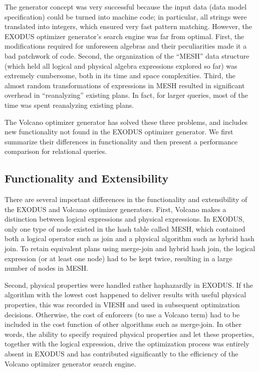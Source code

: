 \documentclass[a4paper,12pt,notitlepage,twoside,openright]{article}
\begin{document}
The generator concept was very successful because the input data (data
model specification) could be turned into machine code; in particular,
all strings were translated into integers, which ensured very fast
pattern matching. However, the EXODUS optimizer generator's search
engine was far from optimal. First, the modifications required for
unforeseen algebras and their peculiarities made it a bad patchwork of
code. Second, the organization of the ``MESH'' data structure (which
held all logical and physical algebra expressions explored so far) was
extremely cumbersome, both in its time and space complexities. Third,
the almost random transformations of expressions in MESH resulted in
significant overhead in ``reanalyzing'' existing plans. In fact, for
larger queries, most of the time was spent reanalyzing existing plans.

The Volcano optimizer generator has solved these three problems, and
includes new functionality not found in the EXODUS optimizer generator.
We first summarize their differences in functionality and then present a
performance comparison for relational queries.

\hypertarget{functionality-and-extensibility}{%
\subsection{Functionality and
Extensibility}\label{functionality-and-extensibility}}

There are several important differences in the functionality and
extensibility of the EXODUS and Volcano optimizer generators. First,
Volcano makes a distinction between logical expressions and physical
expressions. In EXODUS, only one type of node existed in the hash table
called MESH, which contained both a logical operator such as join and a
physical algorithm such as hybrid hash join. To retain equivalent plans
using merge-join and hybrid hash join, the logical expression (or at
least one node) had to be kept twice, resulting in a large number of
nodes in MESH.

Second, physical properties were handled rather haphazardly in EXODUS.
If the algorithm with the lowest cost happened to deliver results with
useful physical properties, this was recorded in VIESH and used in
subsequent optimization decisions. Otherwise, the cost of enforcers (to
use a Volcano term) had to be included in the cost function of other
algorithms such as merge-join. In other words, the ability to specify
required physical properties and let these properties, together with the
logical expression, drive the optimization process was entirely absent
in EXODUS and has contributed significantly to the efficiency of the
Volcano optimizer generator search engine.
\end{document}
